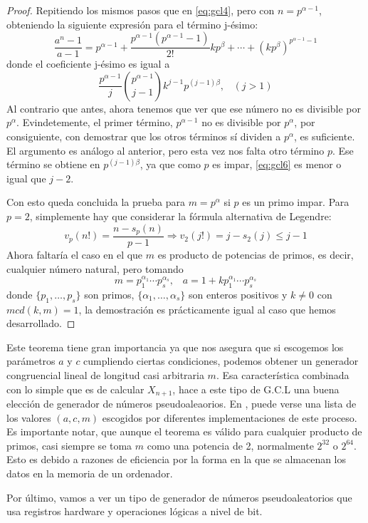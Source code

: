 \begin{proof}
Repitiendo los mismos pasos que en \eqref{eq:gcl4}, pero con $n=p^{\alpha-1}$, obteniendo la siguiente expresión para el término j-ésimo:
\begin{equation}\label{eq:gcl5}
\frac{a^n-1}{a-1}=p^{\alpha-1}+\frac{p^{\alpha-1}(p^{\alpha-1}-1)}{2!}kp^\beta+\cdots+(kp^\beta)^{p^{\alpha-1}-1}
\end{equation}
donde el coeficiente j-ésimo es igual a
\[
\frac{p^{\alpha-1}}{j} \binom{p^{\alpha-1}}{j-1} k^{j-1}p^{(j-1)\beta}, \;\;\; (j>1)
\]
Al contrario que antes, ahora tenemos que ver que ese número no es divisible por $p^\alpha$. Evindetemente, el primer término, $p^{\alpha-1}$ no es divisible por $p^\alpha$, por consiguiente, con demostrar que los otros términos sí dividen a $p^\alpha$, es suficiente. El argumento es análogo al anterior, pero esta vez nos falta otro término $p$. Ese término se obtiene en $p^{(j-1)\beta}$, ya que como $p$ es impar, \eqref{eq:gcl6} es menor o igual que $j-2$.

Con esto queda concluida la prueba para $m=p^\alpha$ si $p$ es un primo impar. Para $p=2$, simplemente  hay que considerar la fórmula alternativa de Legendre:
\[
v_p(n!)=\frac{n-s_p(n)}{p-1} \Rightarrow v_2(j!)=j-s_2(j)\leq j-1
\]
Ahora faltaría el caso en el que $m$ es producto de potencias de primos, es decir, cualquier número natural, pero tomando 
\[
m=p_1^{\alpha_1}\cdots p_s^{\alpha_s}, \;\;\; a=1+kp_1^{\alpha_1}\cdots p_s^{\alpha_s}
\]
donde $\{p_1,\ldots, p_s\}$ son primos, $\{\alpha_1,\ldots,\alpha_s\}$ son enteros positivos y $k\neq 0$ con $mcd(k,m)=1$, la demostración es prácticamente igual al caso que hemos desarrollado.
\end{proof}

Este teorema tiene gran importancia ya que nos asegura que si escogemos los parámetros $a$ y $c$ cumpliendo ciertas condiciones, podemos obtener un generador congruencial lineal de longitud casi arbitraria $m$. Esa característica combinada con lo simple que es de calcular $X_{n+1}$, hace a este tipo de G.C.L una buena elección de generador de números pseudoaleaorios. En \cite{wiki:000}, puede verse una lista de los valores $(a,c,m)$ escogidos por diferentes implementaciones de este proceso. Es importante notar, que aunque el teorema es válido para cualquier producto de primos, casi siempre se toma $m$ como una potencia de 2, normalmente $2^{32}$ o $2^{64}$. Esto es debido a razones de eficiencia por la forma en la que se almacenan los datos en la memoria de un ordenador.

Por último, vamos a ver un tipo de generador de números pseudoaleatorios que usa registros hardware y operaciones lógicas a nivel de bit.

